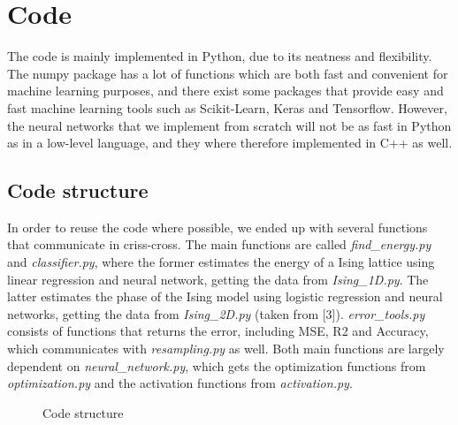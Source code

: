 \section{Code} \label{sec:code}
The code is mainly implemented in Python, due to its neatness and flexibility. The numpy package has a lot of functions which are both fast and convenient for machine learning purposes, and there exist some packages that provide easy and fast machine learning tools such as Scikit-Learn, Keras and Tensorflow. However, the neural networks that we implement from scratch will not be as fast in Python as in a low-level language, and they where therefore implemented in C++ as well. 

\subsection{Code structure} \label{sec:structure}
In order to reuse the code where possible, we ended up with several functions that communicate in criss-cross. The main functions are called \textit{find\_energy.py} and \textit{classifier.py}, where the former estimates the energy of a Ising lattice using linear regression and neural network, getting the data from \textit{Ising\_1D.py}. The latter estimates the phase of the Ising model using logistic regression and neural networks, getting the data from \textit{Ising\_2D.py} (taken from [3]). \textit{error\_tools.py} consists of functions that returns the error, including MSE, R2 and Accuracy, which communicates with \textit{resampling.py} as well. Both main functions are largely dependent on \textit{neural\_network.py}, which gets the optimization functions from \textit{optimization.py} and the activation functions from \textit{activation.py}.
\begin{figure} [H]
\centering
{}
\caption{Code structure}
\label{fig:codestructure}
\end{figure}

